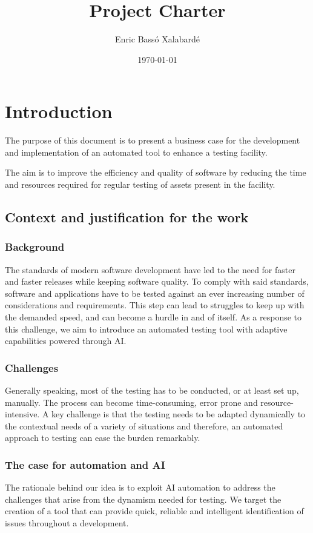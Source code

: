 \documentclass[a4paper, 12pt]{article}
\title{Project Charter}
\author{Enric Bassó Xalabardé}
\date{\today}
\begin{document}
\maketitle
\tableofcontents
\clearpage

\section{Introduction}
The purpose of this document is to present a business case for the development and implementation of an automated tool to enhance a testing facility.

The aim is to improve the efficiency and quality of software by reducing the time and resources required for regular testing of assets present in the facility.

\subsection{Context and justification for the work}
\subsubsection{Background}
The standards of modern software development have led to the need for faster and faster releases while keeping software quality. To comply with said standards, software and applications have to be tested against an ever increasing number of considerations and requirements. This step can lead to struggles to keep up with the demanded speed, and can become a hurdle in and of itself. As a response to this challenge, we aim to introduce an automated testing tool with adaptive capabilities powered through AI.

\subsubsection{Challenges}
Generally speaking, most of the testing has to be conducted, or at least set up, manually. The process can become time-consuming, error prone and resource-intensive. A key challenge is that the testing needs to be adapted dynamically to the contextual needs of a variety of situations and therefore, an automated approach to testing can ease the burden remarkably.

\subsubsection{The case for automation and AI}
The rationale behind our idea is to exploit AI automation to address the challenges that arise from the dynamism needed for testing. We target the creation of a tool that can provide quick, reliable and intelligent identification of issues throughout a development.
\end{document}
